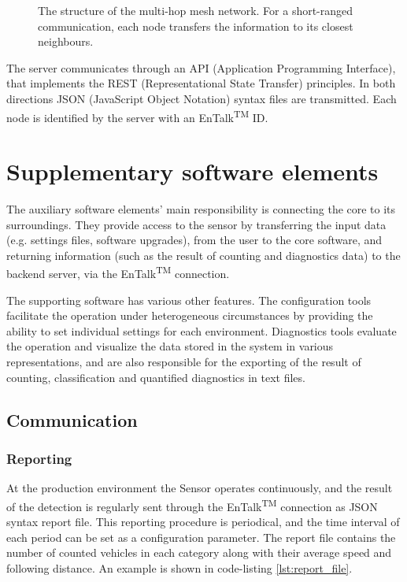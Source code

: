 \begin{figure}[!h]
	\centering
	
	\caption{The structure of the multi-hop mesh network. For a short-ranged communication, each node transfers the information to its closest neighbours. \label{fig:network}}
\end{figure}

The server communicates through an API (Application Programming Interface), that implements the REST (Representational State Transfer) principles. 
In both directions JSON (JavaScript Object Notation) syntax files are transmitted.
Each node is identified by the server with an EnTalk\textsuperscript{TM} ID.
\section{Supplementary software elements}\label{sec:SupplementarySoftware}
The auxiliary software elements' main responsibility is connecting the core to its surroundings.
They provide access to the sensor by transferring the input data (e.g. settings files, software upgrades), from the user to the core software, and returning information (such as the result of counting and diagnostics data) to the backend server, via the EnTalk\textsuperscript{TM} connection.

The supporting software has various other features.
The configuration tools facilitate the operation under heterogeneous circumstances by providing the ability to set individual settings for each environment.
Diagnostics tools evaluate the operation and visualize the data stored in the system in various representations, and are also responsible for the exporting of the result of counting, classification and quantified diagnostics in text files.
\subsection{Communication}
\subsubsection{Reporting}\label{sec:reporting}
At the production environment the Sensor operates continuously, and the result of the detection is regularly sent through the EnTalk\textsuperscript{TM} connection as JSON syntax report file. 
This reporting procedure is periodical, and the time interval of each period can be set as a configuration parameter.
The report file contains the number of counted vehicles in each category along with their average speed and following distance.
An example is shown in code-listing \ref{lst:report_file}.

